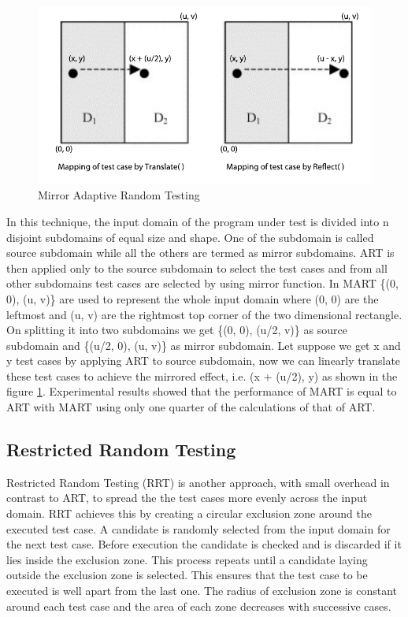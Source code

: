 \begin{figure}[h]
\begin{center}
	\includegraphics[width=13cm, height=6cm ]{Literature/mart2.pdf}
	\caption{Mirror Adaptive Random Testing \cite{Chen2003}}
\label{fig:mirrorART}
\end{center}  
\end{figure}

In this technique, the input domain of the program under test is divided into n disjoint subdomains of equal size and shape. One of the subdomain is called source subdomain while all the others are termed as mirror subdomains. ART is then applied only to the source subdomain to select the test cases and from all other subdomains test cases are selected by using mirror function. In MART \{(0, 0), (u, v)\} are used to represent the whole input domain where (0, 0) are the leftmost and (u, v) are the rightmost top corner of the two dimensional rectangle. On splitting it into two subdomains we get \{(0, 0), (u/2, v)\} as source subdomain and \{(u/2, 0), (u, v)\} as mirror subdomain. Let suppose we get x and y test cases by applying ART to source subdomain, now we can linearly translate these test cases to achieve the mirrored effect, i.e. (x + (u/2), y) as shown in the figure \ref{fig:mirrorART}. Experimental results showed that the performance of MART is equal to ART with MART using only one quarter of the calculations of that of ART.    


\subsection{Restricted Random Testing}
Restricted Random Testing (RRT) \cite{chan2003normalized} is another approach, with small overhead in contrast to ART, to spread the the test cases more evenly across the input domain. RRT achieves this by creating a circular exclusion zone around the executed test case. A candidate is randomly selected from the input domain for the next test case. Before execution the candidate is checked and is discarded if it lies inside the exclusion zone. This process repeats until a candidate laying outside the exclusion zone is selected. This ensures that the test case to be executed is well apart from the last one. The radius of exclusion zone is constant around each test case and the area of each zone decreases with successive cases.

